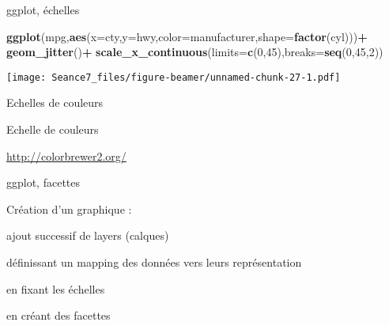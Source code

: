 \documentclass[ignorenonframetext,]{beamer}
\newenvironment{Shaded}{\begin{snugshade}}{\end{snugshade}}
\newcommand{\DataTypeTok}[1]{\textcolor[rgb]{0.13,0.29,0.53}{#1}}
\newcommand{\DecValTok}[1]{\textcolor[rgb]{0.00,0.00,0.81}{#1}}
\newcommand{\KeywordTok}[1]{\textcolor[rgb]{0.13,0.29,0.53}{\textbf{#1}}}
\newcommand{\NormalTok}[1]{#1}
\newcommand{\OperatorTok}[1]{\textcolor[rgb]{0.81,0.36,0.00}{\textbf{#1}}}
\newcommand{\StringTok}[1]{\textcolor[rgb]{0.31,0.60,0.02}{#1}}
\begin{document}
\begin{frame}[fragile]{{ggplot, échelles}}
\protect\hypertarget{ggplot-uxe9chelles}{}

\begin{Shaded}
\begin{Highlighting}[]
\KeywordTok{ggplot}\NormalTok{(mpg,}\KeywordTok{aes}\NormalTok{(}\DataTypeTok{x=}\NormalTok{cty,}\DataTypeTok{y=}\NormalTok{hwy,}\DataTypeTok{color=}\NormalTok{manufacturer,}\DataTypeTok{shape=}\KeywordTok{factor}\NormalTok{(cyl)))}\OperatorTok{+}
\StringTok{  }\KeywordTok{geom_jitter}\NormalTok{()}\OperatorTok{+}
\StringTok{  }\KeywordTok{scale_x_continuous}\NormalTok{(}\DataTypeTok{limits=}\KeywordTok{c}\NormalTok{(}\DecValTok{0}\NormalTok{,}\DecValTok{45}\NormalTok{),}\DataTypeTok{breaks=}\KeywordTok{seq}\NormalTok{(}\DecValTok{0}\NormalTok{,}\DecValTok{45}\NormalTok{,}\DecValTok{2}\NormalTok{))}
\end{Highlighting}
\end{Shaded}

\texttt{[image: Seance7\_files/figure-beamer/unnamed-chunk-27-1.pdf]}

\end{frame}

\begin{frame}{}
\protect\hypertarget{section-24}{}

{Echelles} {de} {couleurs}

\end{frame}

\begin{frame}{Echelle de couleurs}
\protect\hypertarget{echelle-de-couleurs}{}

\url{http://colorbrewer2.org/}

\end{frame}

\begin{frame}{{ggplot, facettes}}
\protect\hypertarget{ggplot-facettes}{}

Création d'un graphique :

ajout successif de layers (calques)

définissant un mapping des données vers leurs représentation

en fixant les échelles

en créant des facettes

\end{frame}
\end{document}
